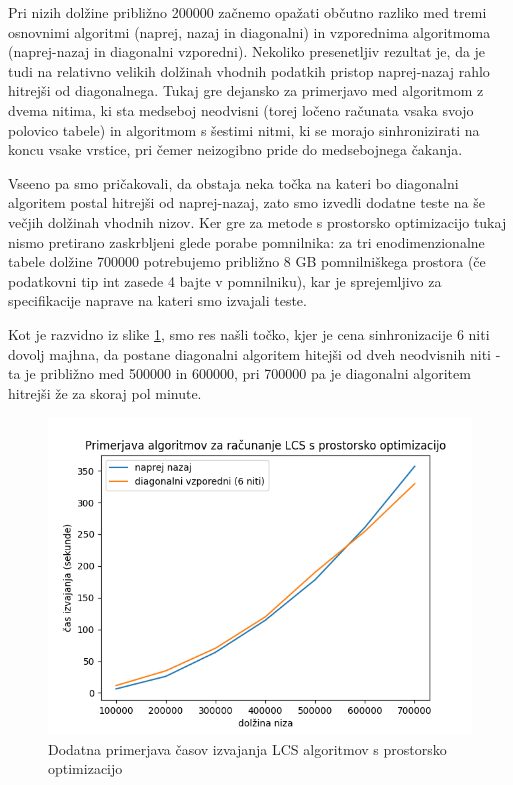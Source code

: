 \documentclass[a4paper,12pt,openright]{book}
\begin{document}
Pri nizih dolžine približno 200000 začnemo opažati občutno razliko med tremi osnovnimi algoritmi (naprej, nazaj in diagonalni) in vzporednima algoritmoma (naprej-nazaj in diagonalni vzporedni). Nekoliko presenetljiv rezultat je, da je tudi na relativno velikih dolžinah vhodnih podatkih pristop naprej-nazaj rahlo hitrejši od diagonalnega. Tukaj gre dejansko za primerjavo med algoritmom z dvema nitima, ki sta medseboj neodvisni (torej ločeno računata vsaka svojo polovico tabele) in algoritmom s šestimi nitmi, ki se morajo sinhronizirati na koncu vsake vrstice, pri čemer neizogibno pride do medsebojnega čakanja. 



Vseeno pa smo pričakovali, da obstaja neka točka na kateri bo diagonalni algoritem postal hitrejši od naprej-nazaj, zato smo izvedli dodatne teste na še večjih dolžinah vhodnih nizov. Ker gre za metode s prostorsko optimizacijo tukaj nismo pretirano zaskrbljeni glede porabe pomnilnika: za tri enodimenzionalne tabele dolžine 700000 potrebujemo približno 8 GB pomnilniškega prostora (če podatkovni tip int zasede 4 bajte v pomnilniku), kar je sprejemljivo za specifikacije naprave na kateri smo izvajali teste. 

Kot je razvidno iz slike \ref{comparison3}, smo res našli točko, kjer je cena sinhronizacije 6 niti dovolj majhna, da postane diagonalni algoritem hitejši od dveh neodvisnih niti - ta je približno med 500000 in 600000, pri 700000 pa je diagonalni algoritem hitrejši že za skoraj pol minute. 

\begin{figure}[H]
\centering
\includegraphics[width=1.0\textwidth]{plots/LCSextended.png}
\caption{Dodatna primerjava časov izvajanja LCS algoritmov s prostorsko optimizacijo}
\label{comparison3}
\end{figure}
\end{document}
